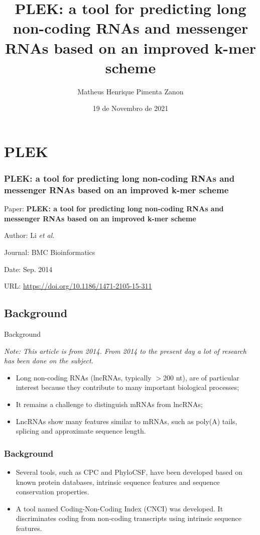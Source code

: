 \documentclass[hyperref={pdfpagelabels=false}]{beamer}
\title{PLEK: a tool for predicting long non-coding RNAs and messenger RNAs based on an improved k-mer scheme}
\author[Matheus Pimenta]{Matheus Henrique Pimenta Zanon}
\institute[UTFPR-CP]{\normalsize Universidade Tecnológica Federal do Paraná \\
	Câmpus Cornélio Procópio
}
\date{19 de Novembro de 2021}
\begin{document}
	
\begin{frame}
\titlepage
\end{frame} 


\section{PLEK} 
\begin{frame}
\frametitle{PLEK: a tool for predicting long non-coding RNAs and messenger RNAs based on an improved k-mer scheme} 
Paper: \textbf{PLEK: a tool for predicting long non-coding RNAs and messenger RNAs based on an improved k-mer scheme}

Author: Li \textit{et al.}

Journal: BMC Bioinformatics

Date: Sep. 2014

URL: \url{https://doi.org/10.1186/1471-2105-15-311}

\end{frame}

\subsection{Background}
\begin{frame}{Background}
\begin{center}
 \textit{Note: This article is from 2014. From 2014 to the present day a lot of research has been done on the subject.}\pause
\end{center}
\begin{itemize}
 \item  Long non-coding RNAs (lncRNAs, typically $>$200 nt), are of particular interest because they contribute to many important biological processes;\pause
 \item It remains a challenge to distinguish mRNAs from lncRNAs;\pause
 \item LncRNAs show many features similar to mRNAs, such as poly(A) tails, splicing and approximate sequence length.
\end{itemize}
\end{frame}

\begin{frame}
\frametitle{Background}
\begin{itemize}
 \item Several tools, such as CPC and PhyloCSF, have been developed based on known protein databases, intrinsic sequence features and sequence conservation properties.\pause
 \item A tool named Coding-Non-Coding Index (CNCI) was developed. It discriminates coding from non-coding transcripts using intrinsic sequence features.
\end{itemize}

\end{frame}
\end{document}
